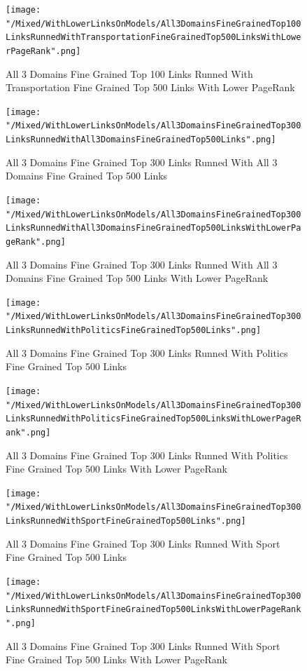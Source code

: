 \documentclass[thesis=M,english]{FITthesis}[2018/05/30]
\begin{document}
	\begin{figure}[H]\centering
		\texttt{[image: "/Mixed/WithLowerLinksOnModels/All3DomainsFineGrainedTop100LinksRunnedWithTransportationFineGrainedTop500LinksWithLowerPageRank".png]}
		\caption{All 3 Domains Fine Grained Top 100 Links Runned With Transportation Fine Grained Top 500 Links With Lower PageRank}\label{}
	\end{figure}
	
	\begin{figure}[H]\centering
		\texttt{[image: "/Mixed/WithLowerLinksOnModels/All3DomainsFineGrainedTop300LinksRunnedWithAll3DomainsFineGrainedTop500Links".png]}
		\caption{All 3 Domains Fine Grained Top 300 Links Runned With All 3 Domains Fine Grained Top 500 Links}\label{}
	\end{figure}
	
	\begin{figure}[H]\centering
		\texttt{[image: "/Mixed/WithLowerLinksOnModels/All3DomainsFineGrainedTop300LinksRunnedWithAll3DomainsFineGrainedTop500LinksWithLowerPageRank".png]}
		\caption{All 3 Domains Fine Grained Top 300 Links Runned With All 3 Domains Fine Grained Top 500 Links With Lower PageRank}\label{}
	\end{figure}
	
	\begin{figure}[H]\centering
		\texttt{[image: "/Mixed/WithLowerLinksOnModels/All3DomainsFineGrainedTop300LinksRunnedWithPoliticsFineGrainedTop500Links".png]}
		\caption{All 3 Domains Fine Grained Top 300 Links Runned With Politics Fine Grained Top 500 Links}\label{}
	\end{figure}
	
	\begin{figure}[H]\centering
		\texttt{[image: "/Mixed/WithLowerLinksOnModels/All3DomainsFineGrainedTop300LinksRunnedWithPoliticsFineGrainedTop500LinksWithLowerPageRank".png]}
		\caption{All 3 Domains Fine Grained Top 300 Links Runned With Politics Fine Grained Top 500 Links With Lower PageRank}\label{}
	\end{figure}
	
	\begin{figure}[H]\centering
		\texttt{[image: "/Mixed/WithLowerLinksOnModels/All3DomainsFineGrainedTop300LinksRunnedWithSportFineGrainedTop500Links".png]}
		\caption{All 3 Domains Fine Grained Top 300 Links Runned With Sport Fine Grained Top 500 Links}\label{}
	\end{figure}
	
	\begin{figure}[H]\centering
		\texttt{[image: "/Mixed/WithLowerLinksOnModels/All3DomainsFineGrainedTop300LinksRunnedWithSportFineGrainedTop500LinksWithLowerPageRank".png]}
		\caption{All 3 Domains Fine Grained Top 300 Links Runned With Sport Fine Grained Top 500 Links With Lower PageRank}\label{}
	\end{figure}
	
\end{document}
